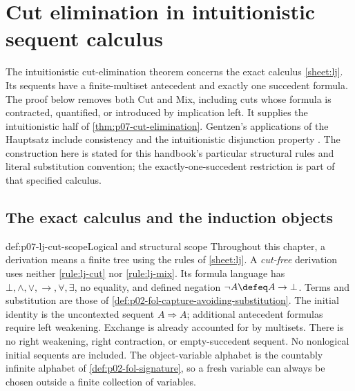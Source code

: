 \section{Cut elimination in intuitionistic sequent calculus}
\label{sec:p07-intuitionistic-cut-elimination}

The intuitionistic cut-elimination theorem concerns the exact calculus
\ref{sheet:lj}.  Its sequents have a finite-multiset antecedent and exactly
one succedent formula.  The proof below removes both Cut and Mix, including
cuts whose formula is contracted, quantified, or introduced by implication
left.  It supplies the intuitionistic half of
\ref{thm:p07-cut-elimination}.  Gentzen's applications of the Hauptsatz
include consistency and the intuitionistic disjunction property
\cite[IV, \S1.1 and \S1.3]{Gentzen1935b}.  The construction here is stated for this
handbook's particular structural rules and literal substitution convention;
the exactly-one-succedent restriction is part of that specified calculus.

\subsection{The exact calculus and the induction objects}
\label{sec:p07-lj-cut-objects}

\begin{hbconvention}{def:p07-lj-cut-scope}{Logical and structural scope}
Throughout this chapter, a derivation means a finite tree using the rules
of \ref{sheet:lj}.  A \emph{cut-free} derivation uses neither
\ref{rule:lj-cut} nor \ref{rule:lj-mix}.  Its formula language has
\(\bot,\land,\lor,\to,\forall,\exists\), no equality, and defined
negation \(\neg A\defeq A\to\bot\).  Terms and substitution are those of
\ref{def:p02-fol-capture-avoiding-substitution}.  The initial identity is
the uncontexted sequent \(A\Rightarrow A\); additional antecedent formulas
require left weakening.  Exchange is already accounted for by multisets.
There is no right weakening, right contraction, or empty-succedent sequent.
No nonlogical initial sequents are included.  The object-variable alphabet
is the countably infinite alphabet of \ref{def:p02-fol-signature}, so a
fresh variable can always be chosen outside a finite collection of variables.
\end{hbconvention}

